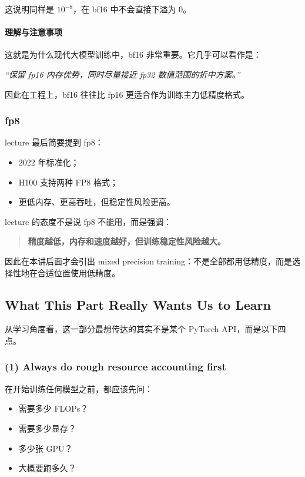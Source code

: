 \documentclass[a4paper,UTF8]{article}
\numberwithin{equation}{section}
\begin{document}
这说明同样是 \(10^{-8}\)，在 bf16 中不会直接下溢为 0。

\paragraph{理解与注意事项}
这就是为什么现代大模型训练中，bf16 非常重要。它几乎可以看作是：
\begin{center}
\emph{“保留 fp16 内存优势，同时尽量接近 fp32 数值范围的折中方案。”}
\end{center}

因此在工程上，bf16 往往比 fp16 更适合作为训练主力低精度格式。

\subsubsection{fp8}

lecture 最后简要提到 fp8：
\begin{itemize}
    \item 2022 年标准化；
    \item H100 支持两种 FP8 格式；
    \item 更低内存、更高吞吐，但稳定性风险更高。
\end{itemize}

lecture 的态度不是说 fp8 不能用，而是强调：
\begin{quote}
\textbf{精度越低，内存和速度越好，但训练稳定性风险越大。}
\end{quote}

因此在本讲后面才会引出 mixed precision training：不是全部都用低精度，而是选择性地在合适位置使用低精度。

\subsection{What This Part Really Wants Us to Learn}

从学习角度看，这一部分最想传达的其实不是某个 PyTorch API，而是以下四点。

\subsubsection{(1) Always do rough resource accounting first}

在开始训练任何模型之前，都应该先问：
\begin{itemize}
    \item 需要多少 FLOPs？
    \item 需要多少显存？
    \item 多少张 GPU？
    \item 大概要跑多久？
\end{itemize}
\end{document}
